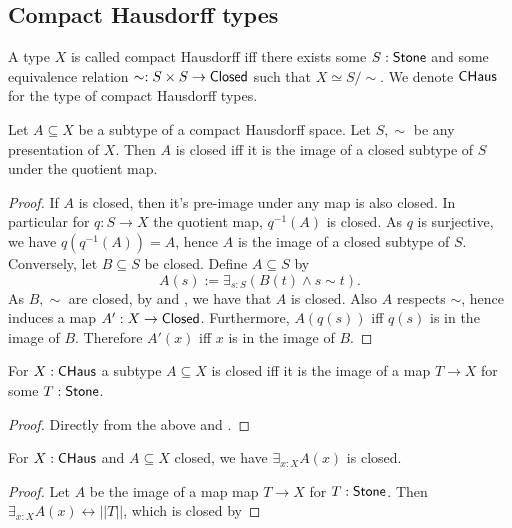 \subsection{Compact Hausdorff types}
\begin{definition}
  A type $X$ is called compact Hausdorff iff there exists some $S:\mathsf{Stone}$ and some 
  equivalence relation $\sim:S \times S \to \mathsf{Closed}$ such that $X \simeq S / \sim$. 
  We denote $\mathsf{CHaus}$ for the type of compact Hausdorff types. 
\end{definition} 

\begin{lemma}\label{CompactHausdorffClosed}
Let $A\subseteq X$ be a subtype of a compact Hausdorff space. 
Let $S, \sim$ be any presentation of $X$. 
Then $A$ is closed iff it is the image of a closed subtype of $S$ under the quotient map. 
\end{lemma}
\begin{proof}
  If $A$ is closed, then it's pre-image under any map is also closed. 
  In particular for $q:S\to X$ the quotient map, $q^{-1}(A)$ is closed. 
  As $q$ is surjective, we have $q(q^{-1}(A)) = A$,
  hence $A$ is the image of a closed subtype of $S$. 
  Conversely, let $B\subseteq S$ be closed. 
  Define $A\subseteq S$ by 
  $$A(s) := \exists_{s:S} (B(t) \wedge s \sim t).$$
  As $B, \sim$ are closed, by  and , 
  we have that $A$  is closed. 
  Also $A$ respects $\sim$, hence induces a map $A': X\to \mathsf{Closed}$.
  Furthermore, $A(q(s))$ iff $q(s)$ is in the image of $B$. 
  Therefore $A'(x)$ iff $x$ is in the image of $B$. 
\end{proof}
\begin{corollary}
  For $X:\mathsf{CHaus}$ a subtype $A\subseteq X$ is closed iff it is the image of 
  a map $T\to X$ for some $T:\mathsf{Stone}$. 
\end{corollary}
\begin{proof}
  Directly from the above and .
\end{proof}

\begin{corollary}\label{InhabitedClosedSubSpaceClosed}
  For $X:\mathsf{CHaus}$ and $A\subseteq X$ closed, we have 
  $\exists_{x:X} A(x)$ is closed. 
\end{corollary}
\begin{proof}
  Let $A$ be the image of a map map $T\to X$ for $T:\mathsf{Stone}$. 
  Then $\exists_{x:X} A(x) \leftrightarrow ||T||$, which is closed by 
\end{proof}


